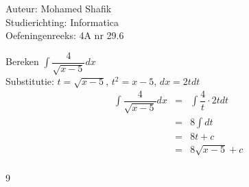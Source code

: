 \documentclass[a4paper]{article}
\begin{document}
\noindent \large Auteur: Mohamed Shafik \\
\noindent \large Studierichting: Informatica\\
\noindent \large Oefeningenreeks: 4A nr 29.6\\

\medskip

\normalsize

Bereken $\displaystyle\int \dfrac{4}{\sqrt{x-5}} dx$\\

Substitutie: $t = \sqrt{x-5}$, $t^2 = x - 5$, $dx = 2t dt$\\

\begin{eqnarray*}
\displaystyle\int \dfrac{4}{\sqrt{x-5}} dx &=& \displaystyle\int \dfrac{4}{t} \cdot 2t dt\\
&=& 8 \displaystyle\int dt\\
&=& 8t + c\\
&=& 8\sqrt{x-5} + c\\
\end{eqnarray*}

\begin{thebibliography}{9}
\end{thebibliography}
\end{document}
